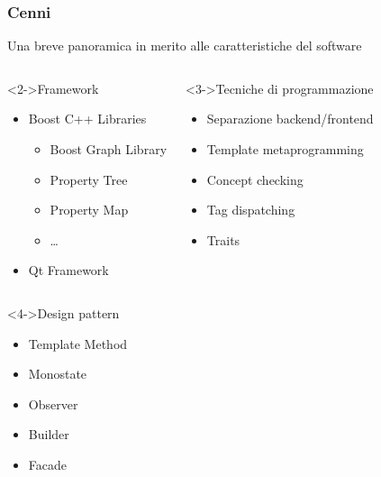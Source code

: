 \begin{frame}
 \frametitle{Cenni}

 \center
 Una breve panoramica in merito alle caratteristiche del software

 \begin{columns}[T]

   \begin{block}<2->{Framework}
    \begin{itemize}
     \item Boost C++ Libraries
      \begin{itemize}
       \item Boost Graph Library
       \item Property Tree
       \item Property Map
       \item \ldots
      \end{itemize}
     \item Qt Framework
    \end{itemize}
   \end{block}


   \begin{block}<3->{Tecniche di programmazione}
    \begin{itemize}
     \item Separazione backend/frontend
     \item Template metaprogramming
     \item Concept checking
     \item Tag dispatching
     \item Traits
    \end{itemize}
   \end{block}

 \end{columns}

 \begin{columns}[B]

   \begin{block}<4->{Design pattern}
    \begin{itemize}
     \item Template Method
     \item Monostate
     \item Observer
     \item Builder
     \item Facade
    \end{itemize}
   \end{block}


\end{columns}
\end{frame}
